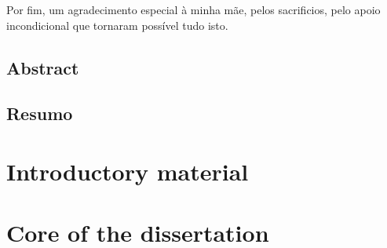 \documentclass[
  oneside,
  11pt, a4paper,
  footinclude=true,
  headinclude=true,
  cleardoublepage=empty
]{scrbook}
\begin{document}
Por fim, um agradecimento especial à minha mãe, pelos sacrificios, pelo apoio incondicional que tornaram possível tudo isto.



	\cleardoublepage
	
\chapter*{Abstract}
	

	\cleardoublepage

\chapter*{Resumo}
	

	\cleardoublepage
	
	\setcounter{page}{3}
	\rm
	
	\cleardoublepage
	\tableofcontents
	
	\cleardoublepage
	\listoffigures
	
	\cleardoublepage
	\listoftables
	
	
	\printglossary[type=\acronymtype, title=List of Acronyms, nonumberlist=true, toctitle=List of Acronyms, style=altlong4colwithindent]
	\cleardoublepage
	\setcounter{page}{3}

\part{Introductory material}



%


\part{Core of the dissertation}



		
\cleardoublepage
\end{document}
